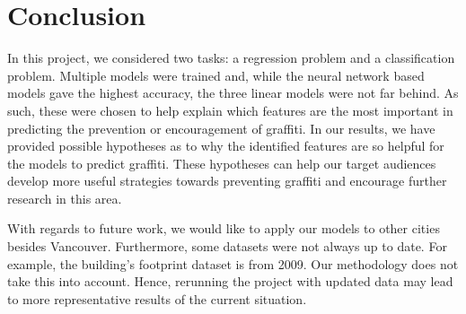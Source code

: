 \chapter{Conclusion}

In this project, we considered two tasks: a regression problem and a classification problem. Multiple models were trained and, while the neural network based models gave the highest accuracy, the three linear models were not far behind. As such, these were chosen to help explain which features are the most important in predicting the prevention or encouragement of graffiti. In our results, we have provided possible hypotheses as to why the identified features are so helpful for the models to predict graffiti. These hypotheses can help our target audiences develop more useful strategies towards preventing graffiti and encourage further research in this area.

With regards to future work, we would like to apply our models to other cities besides Vancouver. Furthermore, some datasets were not always up to date. For example, the building's footprint dataset is from 2009. Our methodology does not take this into account. Hence, rerunning the project with updated data may lead to more representative results of the current situation.
